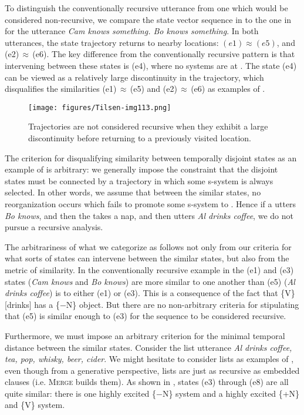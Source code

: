   To distinguish the conventionally recursive utterance from one which would be considered non-recursive, we compare the state vector sequence in {} to the one in {} for the utterance \textit{Cam knows something. Bo knows something}. In both utterances, the state trajectory returns to nearby locations: $(e1) \approx\allowbreak (e5)$, and (e2)\,${\approx}$\,(e6). The key difference from the conventionally recursive pattern is that intervening between these states is (e4), where no systems are at . The state (e4) can be viewed as a relatively large discontinuity in the  trajectory, which disqualifies the similarities (e1)\,${\approx}$\,(e5) and (e2)\,${\approx}$\,(e6) as examples of .

  
\begin{figure}
\texttt{[image: figures/Tilsen-img113.png]}
\caption{Trajectories are not considered recursive when they exhibit a large discontinuity before returning to a previously visited location.}
\label{fig:5:9}
\end{figure}
 

  The criterion for disqualifying similarity between temporally disjoint states as an example of  is arbitrary: we generally impose the constraint that the disjoint states must be connected by a trajectory in which some s-sys\-tem is always selected. In other words, we assume that between the similar states, no reorganization occurs which fails to promote some s-sys\-tem to . Hence if a  utters \textit{Bo knows}, and then the  takes a nap, and then utters \textit{Al drinks coffee}, we do not pursue a recursive analysis. 

  The arbitrariness of what we categorize as  follows not only from our criteria for what sorts of states can intervene between the similar states, but also from the metric of similarity. In the conventionally recursive example in {} the (e1) and (e3) states (\textit{Cam knows} and \textit{Bo knows}) are more similar to one another than (e5) (\textit{Al drinks coffee}) is to either (e1) or (e3). This is a consequence of the fact that \{V\}[drinks] has a \{−N\} object. But there are no non-arbitrary criteria for stipulating that (e5) is similar enough to (e3) for the sequence to be considered recursive.

  Furthermore, we must impose an arbitrary criterion for the minimal temporal distance between the similar states. Consider the list utterance \textit{Al drinks coffee, tea, pop, whisky, beer, cider}. We might hesitate to consider lists as examples of , even though from a generative perspective, lists are just as recursive as embedded clauses (i.e. \textsc{Merge} builds them). As shown in {}, states (e3) through (e8) are all quite similar: there is one highly excited \{−N\} system and a highly excited \{+N\} and \{V\} system.

